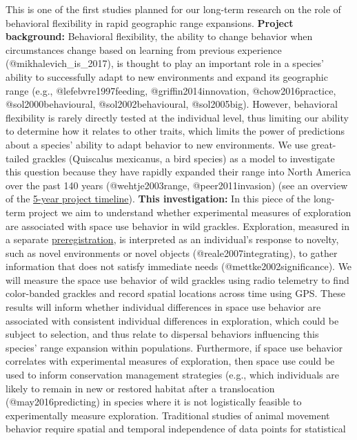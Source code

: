 \documentclass[]{article}
\begin{document}
This is one of the first studies planned for our long-term research on
the role of behavioral flexibility in rapid geographic range expansions.
\textbf{Project background:} Behavioral flexibility, the ability to
change behavior when circumstances change based on learning from
previous experience (@mikhalevich\_is\_2017), is thought to play an
important role in a species' ability to successfully adapt to new
environments and expand its geographic range (e.g.,
@lefebvre1997feeding, @griffin2014innovation, @chow2016practice,
@sol2000behavioural, @sol2002behavioural, @sol2005big). However,
behavioral flexibility is rarely directly tested at the individual
level, thus limiting our ability to determine how it relates to other
traits, which limits the power of predictions about a species' ability
to adapt behavior to new environments. We use great-tailed grackles
(Quiscalus mexicanus, a bird species) as a model to investigate this
question because they have rapidly expanded their range into North
America over the past 140 years (@wehtje2003range, @peer2011invasion)
(see an overview of the
\href{https://github.com/corinalogan/grackles/blob/master/README.md}{5-year
project timeline}). \textbf{This investigation:} In this piece of the
long-term project we aim to understand whether experimental measures of
exploration are associated with space use behavior in wild grackles.
Exploration, measured in a separate
\href{http://corinalogan.com/Preregistrations/g_exploration.html}{preregistration},
is interpreted as an individual's response to novelty, such as novel
environments or novel objects (@reale2007integrating), to gather
information that does not satisfy immediate needs
(@mettke2002significance). We will measure the space use behavior of
wild grackles using radio telemetry to find color-banded grackles and
record spatial locations across time using GPS. These results will
inform whether individual differences in space use behavior are
associated with consistent individual differences in exploration, which
could be subject to selection, and thus relate to dispersal behaviors
influencing this species' range expansion within populations.
Furthermore, if space use behavior correlates with experimental measures
of exploration, then space use could be used to inform conservation
management strategies (e.g., which individuals are likely to remain in
new or restored habitat after a translocation (@may2016predicting) in
species where it is not logistically feasible to experimentally measure
exploration. Traditional studies of animal movement behavior require
spatial and temporal independence of data points for statistical
\end{document}
